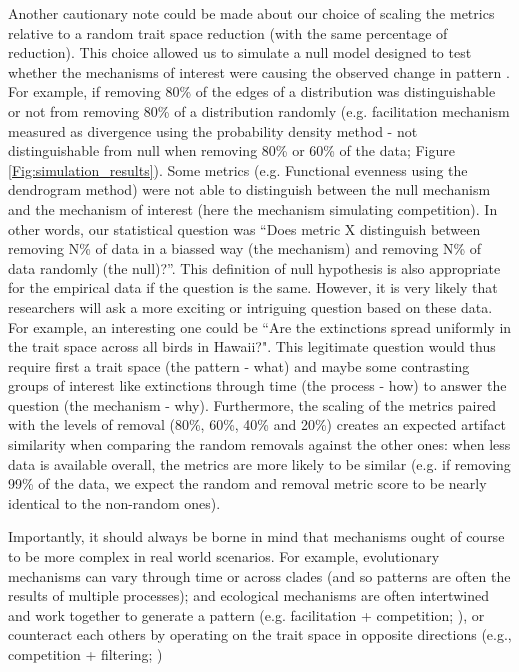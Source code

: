 \documentclass[12pt,letterpaper]{article}
\begin{document}
Another cautionary note could be made about our choice of scaling the metrics relative to a random trait space reduction (with the same percentage of reduction).
This choice allowed us to simulate a null model designed to test whether the mechanisms of interest were causing the observed change in pattern \citep{bausman2018modeling}.
For example, if removing 80\% of the edges of a distribution was distinguishable or not from removing 80\% of a distribution randomly (e.g. facilitation mechanism measured as divergence using the probability density method - not distinguishable from null when removing 80\% or 60\% of the data; Figure \ref{Fig:simulation_results}).
Some metrics (e.g. Functional evenness using the dendrogram method) were not able to distinguish between the null mechanism and the mechanism of interest (here the mechanism simulating competition).
In other words, our statistical question was ``Does metric X distinguish between removing N\% of data in a biassed way (the mechanism) and removing N\% of data randomly (the null)?''.
This definition of null hypothesis is also appropriate for the empirical data if the question is the same.
However, it is very likely that researchers will ask a more exciting or intriguing question based on these data.
For example, an interesting one could be ``Are the extinctions spread uniformly in the trait space across all birds in Hawaii?".
This legitimate question would thus require first a trait space (the pattern - what) and maybe some contrasting groups of interest like extinctions through time (the process - how) to answer the question (the mechanism - why).
Furthermore, the scaling of the metrics paired with the levels of removal (80\%, 60\%, 40\% and 20\%) creates an expected artifact similarity when comparing the random removals against the other ones: when less data is available overall, the metrics are more likely to be similar (e.g. if removing 99\% of the data, we expect the random and removal metric score to be nearly identical to the non-random ones).

Importantly, it should always be borne in mind that mechanisms ought of course to be more complex in real world scenarios.
For example, evolutionary mechanisms can vary through time or across clades (and so patterns are often the results of multiple processes); and ecological mechanisms are often intertwined and work together to generate a pattern (e.g. facilitation + competition; \citealt{danet2024species}), or counteract each others by operating on the trait space in opposite directions (e.g., competition + filtering; \citealt{mammola2024functional})
\end{document}
